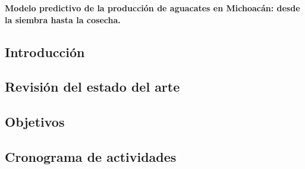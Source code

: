 \documentclass[12pt,oneside,article]{memoir}
\begin{document}
\thispagestyle{firstpagestyle}
\textbf{Modelo predictivo de la producción de aguacates en Michoacán: desde la siembra hasta la cosecha.}

\subsection*{Introducción}



\subsection{Revisión del estado del arte}


\subsection{Objetivos}


\subsection{Cronograma de actividades}


%







\end{document}
